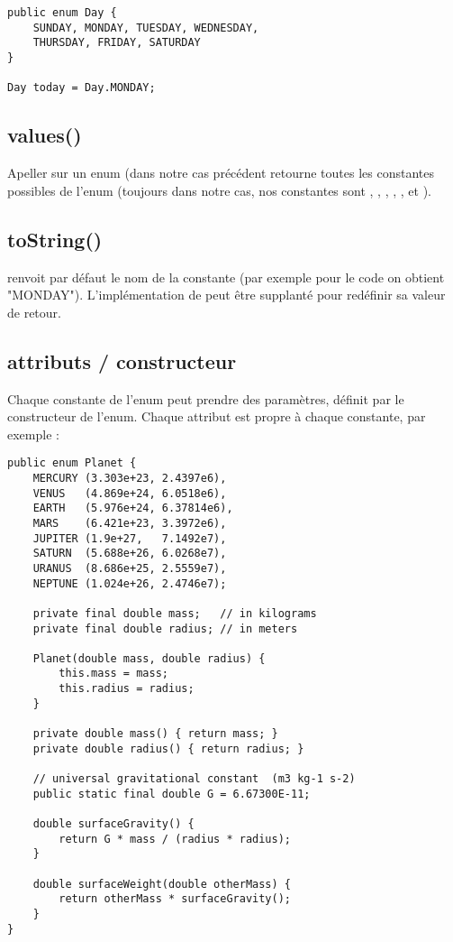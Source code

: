 \begin{verbatim}
public enum Day {
    SUNDAY, MONDAY, TUESDAY, WEDNESDAY,
    THURSDAY, FRIDAY, SATURDAY 
}

Day today = Day.MONDAY;
\end{verbatim}

\subsection{values()}

Apeller  sur un enum (dans notre cas précédent  retourne toutes les constantes possibles de l'enum (toujours dans notre cas, nos constantes sont , , , , ,  et ).

\subsection{toString()}

 renvoit par défaut le nom de la constante (par exemple pour le code  on obtient "MONDAY"). L'implémentation de  peut être supplanté pour redéfinir sa valeur de retour.

\subsection{attributs / constructeur}

Chaque constante de l'enum peut prendre des paramètres, définit par le constructeur de l'enum. Chaque attribut est propre à chaque constante, par exemple :

\begin{verbatim}
public enum Planet {
    MERCURY (3.303e+23, 2.4397e6),
    VENUS   (4.869e+24, 6.0518e6),
    EARTH   (5.976e+24, 6.37814e6),
    MARS    (6.421e+23, 3.3972e6),
    JUPITER (1.9e+27,   7.1492e7),
    SATURN  (5.688e+26, 6.0268e7),
    URANUS  (8.686e+25, 2.5559e7),
    NEPTUNE (1.024e+26, 2.4746e7);

    private final double mass;   // in kilograms
    private final double radius; // in meters
    
    Planet(double mass, double radius) {
        this.mass = mass;
        this.radius = radius;
    }
    
    private double mass() { return mass; }
    private double radius() { return radius; }

    // universal gravitational constant  (m3 kg-1 s-2)
    public static final double G = 6.67300E-11;

    double surfaceGravity() {
        return G * mass / (radius * radius);
    }
    
    double surfaceWeight(double otherMass) {
        return otherMass * surfaceGravity();
    }
}
\end{verbatim}

